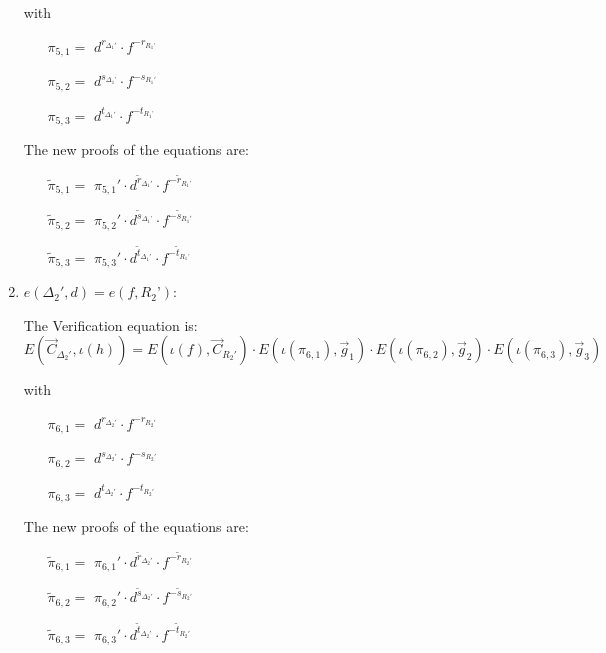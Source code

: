 \begin{description}
\begin{enumerate}
    with
    \begin{itemize}
    \item[$\pi_{5,1} = $] $d^{r_{\Delta_1'}} \cdot f^{-r_{R_1’}}$
    \item[$\pi_{5,2} = $] $d^{s_{\Delta_1’}} \cdot f^{-s_{R_1'}}$
    \item[$\pi_{5,3} = $] $d^{t_{\Delta_1'}} \cdot f^{-t_{R_1’}}$
    \end{itemize}

    The new proofs of the equations are:
    \begin{itemize}
    \item[$\tilde{\pi}_{5,1} = $] $\pi_{5,1}' \cdot d^{\tilde{r}_{\Delta_1'}} \cdot f^{-\tilde{r}_{R_1’}}$
    \item[$\tilde{\pi}_{5,2} = $] $\pi_{5,2}' \cdot d^{\tilde{s}_{\Delta_1’}} \cdot f^{-\tilde{s}_{R_1'}}$
    \item[$\tilde{\pi}_{5,3} = $] $\pi_{5,3}' \cdot d^{\tilde{t}_{\Delta_1'}} \cdot f^{-\tilde{t}_{R_1’}}$
    \end{itemize}

  \item $e(\boxed{\Delta_2'},d) = e(f, \boxed{R_2’})$:

    The Verification equation is:  $E(\vec{C}_{\Delta_2'}, \iota(h)) = E(\iota(f), \vec{C}_{R_2'}) \cdot E(\iota(\pi_{6,1}), \vec{g}_1)\cdot E(\iota(\pi_{6,2}), \vec{g}_2)\cdot E(\iota(\pi_{6,3}), \vec{g}_3)$

    with
    \begin{itemize}
    \item[$\pi_{6,1} = $] $d^{r_{\Delta_2'}} \cdot f^{-r_{R_2'}}$
    \item[$\pi_{6,2} = $] $d^{s_{\Delta_2'}} \cdot f^{-s_{R_2'}}$
    \item[$\pi_{6,3} = $] $d^{t_{\Delta_2'}} \cdot f^{-t_{R_2'}}$
    \end{itemize}

    The new proofs of the equations are:
    \begin{itemize}
    \item[$\tilde{\pi}_{6,1} = $] $\pi_{6,1}' \cdot d^{\tilde{r}_{\Delta_2'}} \cdot f^{-\tilde{r}_{R_2'}}$
    \item[$\tilde{\pi}_{6,2} = $] $\pi_{6,2}' \cdot d^{\tilde{s}_{\Delta_2'}} \cdot f^{-\tilde{s}_{R_2'}}$
    \item[$\tilde{\pi}_{6,3} = $] $\pi_{6,3}' \cdot d^{\tilde{t}_{\Delta_2'}} \cdot f^{-\tilde{t}_{R_2'}}$
    \end{itemize}


\end{enumerate}
\end{description}
